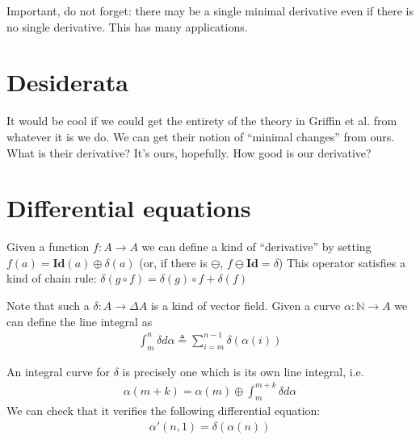 \documentclass[english]{article}
\newcommand{\A}[1]{\mathbf{#1}}
\theoremstyle{plain}
\theoremstyle{remark}
\theoremstyle{remark}
\theoremstyle{remark}
\theoremstyle{definition}
\theoremstyle{definition}
\newcommand{\ra}[0]{\rightarrow}
\begin{document}
Important, do not forget: there may be a single minimal derivative even if there is no single
derivative. This has many applications.

\section{Desiderata}

It would be cool if we could get the entirety of the theory in Griffin et al. from whatever it
is we do. We can get their notion of ``minimal changes'' from ours. What is their derivative?
It's ours, hopefully. How good is our derivative?

\section{Differential equations}

\newcommand{\defeq}[0]{\triangleq}
Given a function $f : A \ra A$ we can define a kind of ``derivative'' by setting
$f(a) = \A{Id}(a) \oplus \delta (a)$ (or, if there is $\ominus$, $f \ominus \A{Id} = \delta$)
This operator satisfies a kind of chain rule: $\delta(g\circ f) = \delta(g) \circ f + \delta(f)$

Note that such a $\delta : A \ra \Delta A$ is a kind of vector field.
Given a curve $\alpha : \mathbb{N} \ra A$ we can
define the line integral as
\begin{align*}
  \int_m^n \delta d\alpha \defeq \sum_{i = m}^{n-1} \delta(\alpha(i))
\end{align*}

An integral curve for $\delta$ is precisely one which is its own line integral, i.e.
\begin{align*}
  \alpha(m + k) = \alpha(m) \oplus \int_m^{m+k}\delta d\alpha
\end{align*}
We can check that it verifies the following differential equation:
\begin{align*}
  \alpha'(n, 1) = \delta(\alpha(n))
\end{align*}
\end{document}
